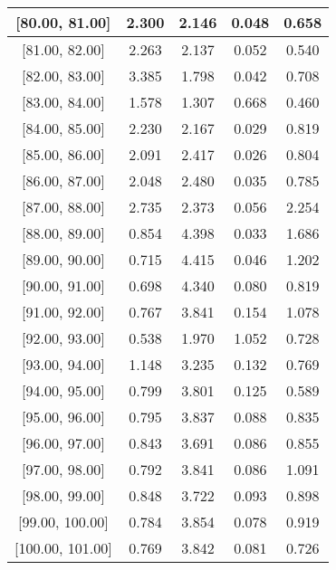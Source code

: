 \documentclass[12pt]{article}
\begin{document}
\begin{table}[]
\begin{tabular}{c|c|c|c|c|}
\multicolumn{1}{|c|}{{[}80.00,  81.00{]}}  & 2.300 & 2.146 & 0.048 & 0.658 \\ \hline 
\multicolumn{1}{|c|}{{[}81.00,  82.00{]}}  & 2.263 & 2.137 & 0.052 & 0.540 \\ \hline 
\multicolumn{1}{|c|}{{[}82.00,  83.00{]}}  & 3.385 & 1.798 & 0.042 & 0.708 \\ \hline 
\multicolumn{1}{|c|}{{[}83.00,  84.00{]}}  & 1.578 & 1.307 & 0.668 & 0.460 \\ \hline 
\multicolumn{1}{|c|}{{[}84.00,  85.00{]}}  & 2.230 & 2.167 & 0.029 & 0.819 \\ \hline 
\multicolumn{1}{|c|}{{[}85.00,  86.00{]}}  & 2.091 & 2.417 & 0.026 & 0.804 \\ \hline 
\multicolumn{1}{|c|}{{[}86.00,  87.00{]}}  & 2.048 & 2.480 & 0.035 & 0.785 \\ \hline 
\multicolumn{1}{|c|}{{[}87.00,  88.00{]}}  & 2.735 & 2.373 & 0.056 & 2.254 \\ \hline 
\multicolumn{1}{|c|}{{[}88.00,  89.00{]}}  & 0.854 & 4.398 & 0.033 & 1.686 \\ \hline 
\multicolumn{1}{|c|}{{[}89.00,  90.00{]}}  & 0.715 & 4.415 & 0.046 & 1.202 \\ \hline 
\multicolumn{1}{|c|}{{[}90.00,  91.00{]}}  & 0.698 & 4.340 & 0.080 & 0.819 \\ \hline 
\multicolumn{1}{|c|}{{[}91.00,  92.00{]}}  & 0.767 & 3.841 & 0.154 & 1.078 \\ \hline 
\multicolumn{1}{|c|}{{[}92.00,  93.00{]}}  & 0.538 & 1.970 & 1.052 & 0.728 \\ \hline 
\multicolumn{1}{|c|}{{[}93.00,  94.00{]}}  & 1.148 & 3.235 & 0.132 & 0.769 \\ \hline 
\multicolumn{1}{|c|}{{[}94.00,  95.00{]}}  & 0.799 & 3.801 & 0.125 & 0.589 \\ \hline 
\multicolumn{1}{|c|}{{[}95.00,  96.00{]}}  & 0.795 & 3.837 & 0.088 & 0.835 \\ \hline 
\multicolumn{1}{|c|}{{[}96.00,  97.00{]}}  & 0.843 & 3.691 & 0.086 & 0.855 \\ \hline 
\multicolumn{1}{|c|}{{[}97.00,  98.00{]}}  & 0.792 & 3.841 & 0.086 & 1.091 \\ \hline 
\multicolumn{1}{|c|}{{[}98.00,  99.00{]}}  & 0.848 & 3.722 & 0.093 & 0.898 \\ \hline 
\multicolumn{1}{|c|}{{[}99.00,  100.00{]}}  & 0.784 & 3.854 & 0.078 & 0.919 \\ \hline 
\multicolumn{1}{|c|}{{[}100.00,  101.00{]}}  & 0.769 & 3.842 & 0.081 & 0.726 \\ \hline 

\end{tabular}
\end{table}
\end{document}
